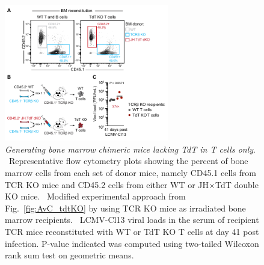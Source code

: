 \begin{figure}
    \centering
    \includegraphics[width=0.64\textwidth]{Figures/AvC/figS4_tdtKO.pdf}
    \caption[Generating bone marrow chimeric mice lacking TdT in T cells only]{\textit{Generating bone marrow chimeric mice lacking TdT in T cells only}. %
    ~Representative flow cytometry plots showing the percent of bone marrow cells from each set of donor mice, namely CD45.1\pos{} cells from TCR\textbeta{} KO mice and CD45.2\pos{} cells from either WT or JH$\times$TdT double KO mice. %
    ~Modified experimental approach from Fig.~\ref{fig:AvC_tdtKO} by using TCR\textbeta{} KO mice as irradiated bone marrow recipients. %
    ~LCMV-Cl13 viral loads in the serum of recipient TCR\textbeta{}\KO{} mice reconstituted with WT or TdT KO T cells at day 41 post infection. P-value indicated was computed using two-tailed Wilcoxon rank sum test on geometric means.}
    \label{fig:AvC_supp_tdtKO}
\end{figure}


